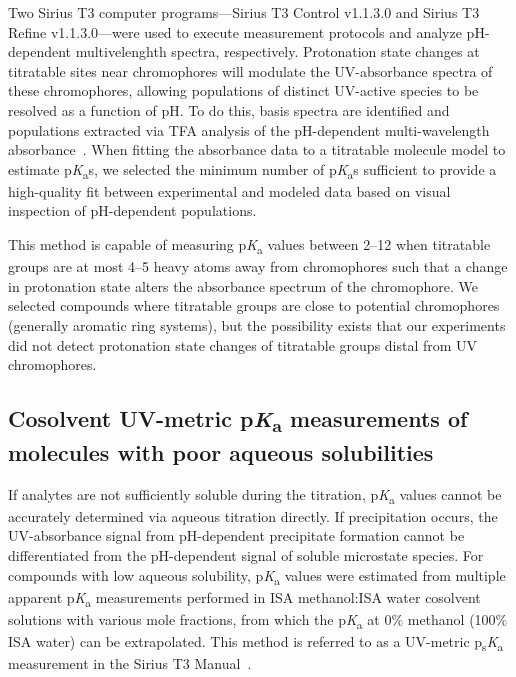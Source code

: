 \documentclass[9pt,lineno]{elife}
\newcommand{\pKa}{p\textit{K}\textsubscript{a}}
\newcommand{\psKa}{p\textsubscript{s}\textit{K}\textsubscript{a}}
\begin{document}
Two Sirius T3 computer programs---Sirius T3 Control v1.1.3.0 and Sirius T3 Refine v1.1.3.0---were used to execute measurement protocols and analyze pH-dependent multivelenghth spectra, respectively.
Protonation state changes at titratable sites near chromophores will modulate the UV-absorbance spectra of these chromophores, allowing populations of distinct UV-active species to be resolved as a function of pH. 
To do this, basis spectra are identified and populations extracted via TFA analysis of the pH-dependent multi-wavelength absorbance~\citep{allen_multiwavelength_1998}. 
When fitting the absorbance data to a titratable molecule model to estimate \pKa{}s, we selected the minimum number of \pKa{}s sufficient to provide a high-quality fit between experimental and modeled data based on visual inspection of pH-dependent populations.

This method is capable of measuring \pKa{} values between 2--12 when titratable groups are at most 4--5 heavy atoms away from chromophores such that a change in protonation state alters the absorbance spectrum of the chromophore. 
We selected compounds where titratable groups are close to potential chromophores (generally aromatic ring systems), but the possibility exists that our experiments did not detect protonation state changes of titratable groups distal from UV chromophores.

\subsection{Cosolvent UV-metric \pKa{} measurements of molecules with poor aqueous solubilities}

If analytes are not sufficiently soluble during the titration, \pKa{} values cannot be accurately determined via aqueous titration directly. 
If precipitation occurs, the UV-absorbance signal from pH-dependent precipitate formation cannot be differentiated from the pH-dependent signal of soluble microstate species. 
For compounds with low aqueous solubility, \pKa{} values were estimated from multiple apparent \pKa{} measurements performed in ISA methanol:ISA water cosolvent solutions with various mole fractions, from which the \pKa{} at 0\% methanol (100\% ISA water) can be extrapolated. 
This method is referred to as a UV-metric \psKa{} measurement in the Sirius T3 Manual~\citep{noauthor_sirius_2008}.
\end{document}
